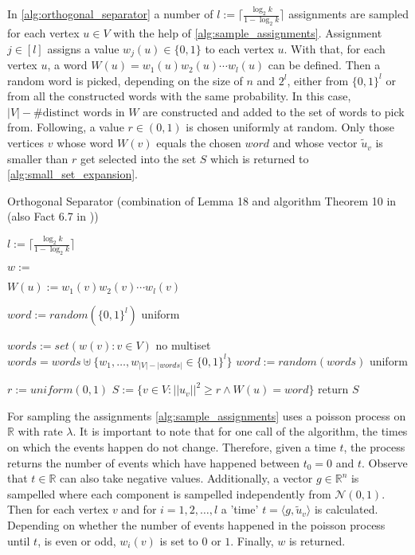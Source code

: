 In \cref{alg:orthogonal_separator} a number of $l := \lceil \frac{\log_2 k}{1-\log_2 k}\rceil$ assignments are sampled for each vertex $u \in V$ with the help of \cref{alg:sample_assignments}. Assignment $j \in [l]$ assigns a value $w_j(u) \in \{0,1\}$ to each vertex $u$. With that, for each vertex $u$, a word $W(u) =  w_1(u)w_2(u)\cdots w_l(u)$ can be defined. Then a random word is picked, depending on the size of $n$ and $2^l$, either from $\{0,1\}^l$ or from all the constructed words with the same probability. In this case, $|V|-\# \text{distinct words in }W$ are constructed and added to the set of words to pick from. Following, a value $r\in(0,1)$ is chosen uniformly at random. Only those vertices $v$ whose word $W(v)$ equals the chosen $word$ and whose vector $\tilde{u}_v$ is smaller than $r$ get selected into the set $S$ which is returned to \cref{alg:small_set_expansion}.

\begin{algorithm}[htpb]
	\caption{Orthogonal Separator (combination of Lemma 18 and algorithm Theorem 10 in \cite{LouisM14} (also Fact 6.7 in \cite{ChanLTZ16})) \label{alg:orthogonal_separator}} 
\begin{algorithmic}
	\State $l := \lceil \frac{\log_2 k}{1-\log_2 k}\rceil$


	
	\State $w := $
	
	\State $W(u) := w_1(v)w_2(v)\cdots w_l(v)$
	\EndFor
	
	\State $word := random( \{0,1\}^l)$ \Comment uniform
	
	\Else
	 
	\State $words := set({w(v): v\in V})$ \Comment no multiset
	\State $words = words \uplus \{w_1, \ldots , w_{|V|-|words|} \in \{0,1\}^l\} $ 
	\State $word := random(words)$ \Comment uniform
	
	\EndIf
	
	\State $r := uniform(0,1)$
	\State $S := \{v \in V: ||u_v||^2 \ge r \land W(u) = word \}$
	\State return $S$
	
	\EndFunction %
\end{algorithmic}
\end{algorithm}	

For sampling the assignments \cref{alg:sample_assignments} uses a poisson process on $\mathbb{R}$ with rate $\lambda$. It is important to note that for one call of the algorithm, the times on which the events happen do not change. Therefore, given a time $t$, the process returns the number of events which have happened between $t_0 = 0$ and $t$. Observe that $t\in \mathbb{R}$ can also take negative values.
Additionally, a vector $g \in \mathbb{R}^n$ is sampelled where each component is sampelled independently from $\mathcal{N}(0,1)$. Then for each vertex $v$ and for $i = 1, 2, \ldots, l$ a 'time' $t = \langle g, \tilde{u}_v \rangle $ is calculated. Depending on whether the number of events happened in the poisson process until $t$, is even or odd, $w_i(v)$ is set to $0$ or $1$. Finally, $w$ is returned.
	
